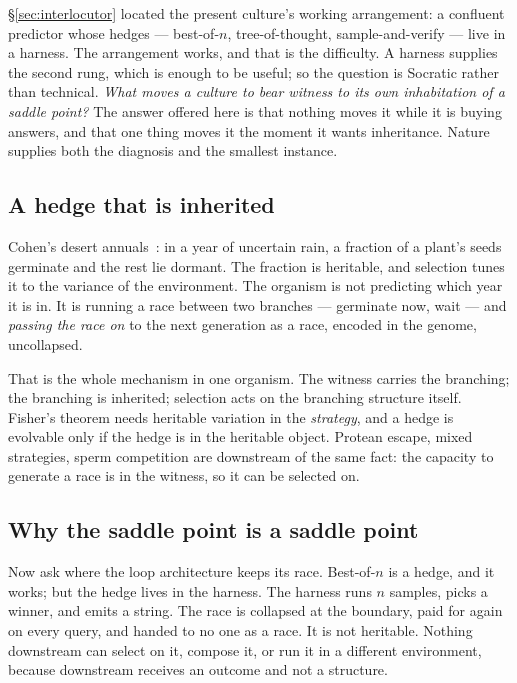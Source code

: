 \documentclass[11pt]{article}
\theoremstyle{plain}
\theoremstyle{definition}
\theoremstyle{remark}
\begin{document}
\S\ref{sec:interlocutor} located the present culture's working arrangement:
a confluent predictor whose hedges --- best-of-$n$, tree-of-thought,
sample-and-verify --- live in a harness. The arrangement works, and that is
the difficulty. A harness supplies the second rung, which is enough to be
useful; so the question is Socratic rather than technical. \emph{What moves a
culture to bear witness to its own inhabitation of a saddle point?} The
answer offered here is that nothing moves it while it is buying answers,
and that one thing moves it the moment it wants inheritance. Nature supplies
both the diagnosis and the smallest instance.

\subsection{A hedge that is inherited}

Cohen's desert annuals~\cite{Cohen66}: in a year of uncertain rain, a
fraction of a plant's seeds germinate and the rest lie dormant. The fraction
is heritable, and selection tunes it to the variance of the environment. The
organism is not predicting which year it is in. It is running a race between
two branches --- germinate now, wait --- and \emph{passing the race on} to the
next generation as a race, encoded in the genome, uncollapsed.

That is the whole mechanism in one organism. The witness carries the
branching; the branching is inherited; selection acts on the branching
structure itself. Fisher's theorem needs heritable variation in the
\emph{strategy}, and a hedge is evolvable only if the hedge is in the heritable
object. Protean escape, mixed strategies, sperm competition are downstream of
the same fact: the capacity to generate a race is in the witness, so it can
be selected on.

\subsection{Why the saddle point is a saddle point}

Now ask where the loop architecture keeps its race. Best-of-$n$ is a hedge,
and it works; but the hedge lives in the harness. The harness runs $n$
samples, picks a winner, and emits a string. The race is collapsed at the
boundary, paid for again on every query, and handed to no one as a race. It
is not heritable. Nothing downstream can select on it, compose it, or run it
in a different environment, because downstream receives an outcome and not a
structure.
\end{document}
